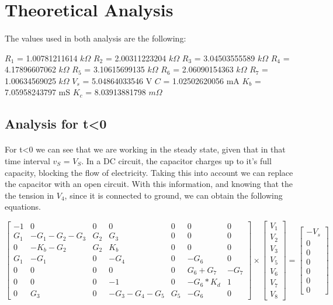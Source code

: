 \section{Theoretical Analysis}
\label{sec:analysis}

\paragraph{} The values used in both analysis are the following:

$R_1$ = 1.00781211614 $k\Omega$
$R_2$ = 2.00311223204 $k\Omega$
$R_3$ = 3.04503555589 $k\Omega$
$R_4$ = 4.17896607062 $k\Omega$
$R_5$ = 3.10615699135 $k\Omega$
$R_6$ = 2.06090154363 $k\Omega$
$R_7$ = 1.00634569025 $k\Omega$
$V_s$ = 5.04864033546 V
$C$ = 1.02502620056 mA
$K_b$ = 7.05958243797 mS
$K_c$ = 8.03913881798 $m\Omega$

\subsection{Analysis for t<0}

\paragraph{} For t<0 we can see that we are working in the steady state, given that in that time interval $v_S$ = $V_S$. In a DC circuit, the capacitor charges up to it's full capacity, blocking the flow of electricity. Taking 
this into account we can replace the capacitor with an open circuit. With this information, and knowing that the the tension in $V_4$, since it is connected to ground, we can obtain the following equations.

\begin{equation}
\begin{bmatrix}
	-1	&	0	&	0	&	0	&	0	&	0	&	0 \\
	G_1	&	-G_1 - G_2 - G_3	&	G_2	&	G_3	&	0	&	0	&	0 \\
	0	&	-K_b - G_2	&	G_2	&	K_b	&	0	&	0	&	0 \\
	G_1	&	-G_1	&	0	&	-G_4	&	0	&	-G_6	&	0 \\
	0	&	0	&	0	&	0	&	0	&	G_6 + G_7	&	-G_7 \\
	0	&	0	&	0	&	-1	&	0	&	-G_6 *	K_d	&	1 \\
	0	&	G_3	&	0	&	-G_3 - G_4 - G_5	&	G_5	&	-G_6	&	0
\end{bmatrix}
\times
\begin{bmatrix}
	V_1 \\
	V_2 \\
	V_3 \\
	V_5 \\
	V_6 \\
	V_7 \\
	V_8
\end{bmatrix}
=
\begin{bmatrix}
	-V_s \\
	0 \\
	0 \\
	0 \\
	0 \\
	0 \\
	0
	\label{m:1}
\end{bmatrix}
\end{equation}

